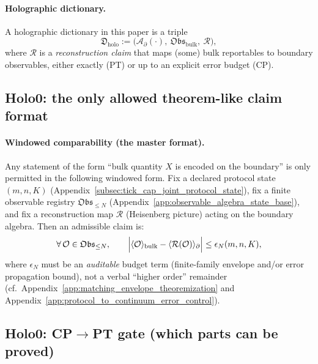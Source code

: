 \paragraph{Holographic dictionary.}
\AuditTag A holographic dictionary in this paper is a triple
\[
\mathfrak{D}_{\mathrm{holo}}:=
\bigl(\mathcal{A}_{\partial}(\cdot),\ \mathfrak{Obs}_{\mathrm{bulk}},\ \mathcal{R}\bigr),
\]
where $\mathcal{R}$ is a \emph{reconstruction claim} that maps (some) bulk reportables to boundary observables,
either exactly (PT) or up to an explicit error budget (CP).

\subsection{Holo0: the only allowed theorem-like claim format}
\label{subsec:holo0_allowed_claim_format}

\paragraph{Windowed comparability (the master format).}
\AuditTag Any statement of the form ``bulk quantity $X$ is encoded on the boundary'' is only permitted
in the following windowed form.
Fix a declared protocol state $(m,n,K)$ (Appendix~\ref{subsec:tick_cap_joint_protocol_state}),
fix a finite observable registry $\mathfrak{Obs}_{\le N}$ (Appendix~\ref{app:observable_algebra_state_base}),
and fix a reconstruction map $\mathcal{R}$ (Heisenberg picture) acting on the boundary algebra.
Then an admissible claim is:
\[
\forall\,\mathcal{O}\in\mathfrak{Obs}_{\le N},\qquad
\Bigl|\langle \mathcal{O}\rangle_{\mathrm{bulk}}-\langle \mathcal{R}(\mathcal{O})\rangle_{\partial}\Bigr|
\le \epsilon_N(m,n,K),
\]
where $\epsilon_N$ must be an \emph{auditable} budget term (finite-family envelope and/or error propagation bound),
not a verbal ``higher order'' remainder (cf.\ Appendix~\ref{app:matching_envelope_theoremization} and
Appendix~\ref{app:protocol_to_continuum_error_control}).

\subsection{Holo0: CP\texorpdfstring{$\to$}{->}PT gate (which parts can be proved)}
\label{subsec:holo0_cp_to_pt_gate}

